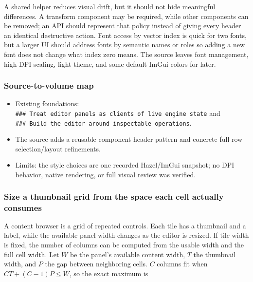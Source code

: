 A shared helper reduces visual drift, but it should not hide meaningful differences. A transform component may be required, while other components can be removed; an API should represent that policy instead of giving every header an identical destructive action. Font access by vector index is quick for two fonts, but a larger UI should address fonts by semantic names or roles so adding a new font does not change what index zero means. The source leaves font management, high-DPI scaling, light theme, and some default ImGui colors for later.

\subsubsection{Source-to-volume map}\label{06-engine-ii-ch032-source-to-volume-map-3}

\hypertarget{06-engine-ii-ch032-source-to-volume-map-3}{}

\begin{itemize}
\tightlist
\item
  Existing foundations: \texttt{\#\#\#\ Treat\ editor\ panels\ as\ clients\ of\ live\ engine\ state} and \texttt{\#\#\#\ Build\ the\ editor\ around\ inspectable\ operations}.
\item
  The source adds a reusable component-header pattern and concrete full-row selection/layout refinements.
\item
  Limits: the style choices are one recorded Hazel/ImGui snapshot; no DPI behavior, native rendering, or full visual review was verified.
\end{itemize}

\subsubsection{Size a thumbnail grid from the space each cell actually consumes}\label{06-engine-ii-ch032-size-a-thumbnail-grid-from-the-space-each-cell-actually-consumes}

\hypertarget{06-engine-ii-ch032-size-a-thumbnail-grid-from-the-space-each-cell-actually-consumes}{}

A content browser is a grid of repeated controls. Each tile has a thumbnail and a label, while the available panel width changes as the editor is resized. If tile width is fixed, the number of columns can be computed from the usable width and the full cell width. Let \(W\) be the panel's available content width, \(T\) the thumbnail width, and \(P\) the gap between neighboring cells. \(C\) columns fit when \(CT+(C-1)P\leq W\), so the exact maximum is

